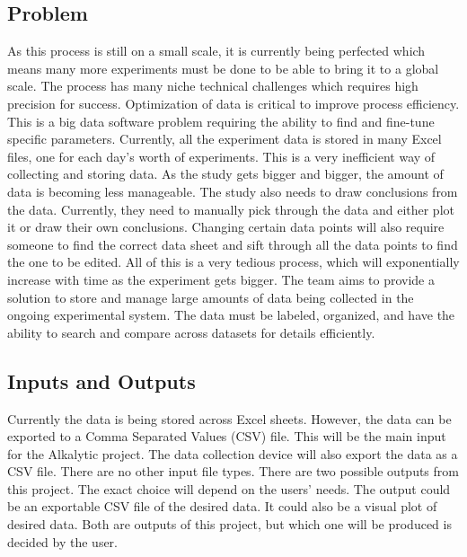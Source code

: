\documentclass{article}
\begin{document}
\subsection{Problem}
As this process is still on a small scale, it is currently being perfected which
means many more experiments must be done to be able to bring it to a global
scale. The process has many niche technical challenges which requires high
precision for success. Optimization of data is critical to improve process
efficiency. This is a big data software problem requiring the ability to find
and fine-tune specific parameters. \newline \newline
Currently, all the experiment data is stored in many Excel files, one for each
day's worth of experiments. This is a very inefficient way of collecting and
storing data. As the study gets bigger and bigger, the amount of data is
becoming less manageable. The study also needs to draw conclusions from the
data. Currently, they need to manually pick through the data and either plot it
or draw their own conclusions. Changing certain data points will also require
someone to find the correct data sheet and sift through all the data points to
find the one to be edited. All of this is a very tedious process, which will
exponentially increase with time as the experiment gets bigger. The team aims to
provide a solution to store and manage large amounts of data being collected in
the ongoing experimental system. The data must be labeled, organized, and have
the ability to search and compare across datasets for details efficiently.

\subsection{Inputs and Outputs}
Currently the data is being stored across Excel sheets. However, the data can be
exported to a Comma Separated Values (CSV) file. This will be the main input for
the Alkalytic project. The data collection device will also export the data as a
CSV file. There are no other input file types.
\newline
\newline
There are two possible outputs from this project. The exact choice will depend
on the users' needs. The output could be an exportable CSV file of the desired
data. It could also be a visual plot of desired data. Both are outputs of this
project, but which one will be produced is decided by the user.
\end{document}
